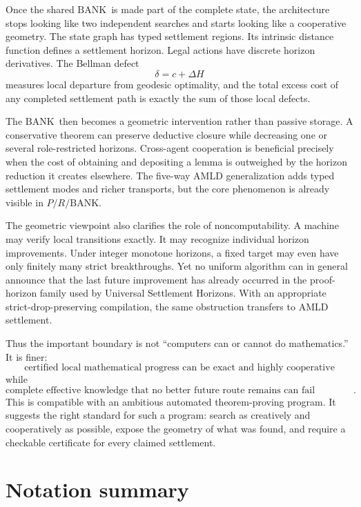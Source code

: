 \documentclass[11pt]{article}
\theoremstyle{remark}
\newcommand{\BANK}{\ensuremath{\mathrm{BANK}}}
\begin{document}
Once the shared \BANK\ is made part of the complete state, the architecture stops looking like two independent searches and starts looking like a cooperative geometry. The state graph has typed settlement regions. Its intrinsic distance function defines a settlement horizon. Legal actions have discrete horizon derivatives. The Bellman defect
\[
\delta=c+\Delta H
\]
measures local departure from geodesic optimality, and the total excess cost of any completed settlement path is exactly the sum of those local defects.

The \BANK\ then becomes a geometric intervention rather than passive storage. A conservative theorem can preserve deductive closure while decreasing one or several role-restricted horizons. Cross-agent cooperation is beneficial precisely when the cost of obtaining and depositing a lemma is outweighed by the horizon reduction it creates elsewhere. The five-way AMLD generalization adds typed settlement modes and richer transports, but the core phenomenon is already visible in $P/R/\BANK$.

The geometric viewpoint also clarifies the role of noncomputability. A machine may verify local transitions exactly. It may recognize individual horizon improvements. Under integer monotone horizons, a fixed target may even have only finitely many strict breakthroughs. Yet no uniform algorithm can in general announce that the last future improvement has already occurred in the proof-horizon family used by Universal Settlement Horizons. With an appropriate strict-drop-preserving compilation, the same obstruction transfers to AMLD settlement.

Thus the important boundary is not ``computers can or cannot do mathematics.'' It is finer:
\[
\boxed{
\text{certified local mathematical progress can be exact and highly cooperative}
}
\]
while
\[
\boxed{
\text{complete effective knowledge that no better future route remains can fail uniformly}.
}
\]
This is compatible with an ambitious automated theorem-proving program. It suggests the right standard for such a program: search as creatively and cooperatively as possible, expose the geometry of what was found, and require a checkable certificate for every claimed settlement.

\appendix

\section{Notation summary}
\end{document}
